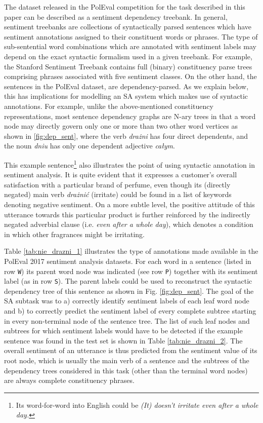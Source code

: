 \documentclass[10pt, a4paper]{article}
\begin{document}
The dataset released in the PolEval competition for the task described in this paper can be described as a sentiment dependency treebank. In general, sentiment treebanks are collections of syntactically parsed sentences which have sentiment annotations assigned to their constituent words or phrases. The type of sub-sentential word combinations which are annotated with  sentiment labels may depend on the exact syntactic formalism used in a given treebank. For example, the Stanford Sentiment Treebank \cite{socher2013recursive} contains full (binary) constituency parse trees comprising phrases associated with five sentiment classes. On the other hand, the sentences in the PolEval dataset, are dependency-parsed. As we explain below, this has implications for modelling an SA system which makes use of syntactic annotations. For example, unlike the above-mentioned constituency representations, most sentence dependency graphs are N-ary trees in that a word node may directly govern only one or more than two other word vertices as shown in \ref{fig:dep_sent}, where the verb \textit{drażni} has four direct dependents, and the noun \textit{dniu} has only one dependent adjective \textit{całym}. 
\par This example sentence\footnote{Its word-for-word into English could be \textit{(It) doesn't irritate even after a whole day.}} also illustrates the point of using syntactic annotation in sentiment analysis. It is quite evident that it expresses a customer's overall satisfaction with a particular brand of perfume, even though its (directly negated) main verb \textit{drażnić} (irritate) could be found in a list of keywords denoting negative sentiment. On a more subtle level, the positive attitude of this utterance towards this particular product is further reinforced by the indirectly negated adverbial clause (i.e. \textit{even after a whole day}), which denotes a condition in which other fragrances might be irritating.
\par Table \ref{tab:nie_drazni_1} illustrates the type of annotations made available in the PolEval 2017 sentiment analysis datasets. For each word in a sentence (listed in row \texttt{W}) its parent word node was indicated (see row \texttt{P}) together with its sentiment label (as in row \texttt{S}). The parent labels could be used to reconstruct the syntactic dependency tree of this sentence as shown in Fig. \ref{fig:dep_sent}. The goal of the SA subtask was to  a) correctly identify sentiment labels of each leaf word node and b) to correctly predict the sentiment label of every complete subtree starting in every non-terminal node of the sentence tree. The list of such leaf nodes and subtrees for which sentiment labels would have to be detected if the example sentence was found in the test set is shown in Table \ref{tab:nie_drazni_2}. The overall sentiment of an utterance is thus predicted from the sentiment value of its root node, which is usually the main verb of a sentence and the subtrees of the dependency trees considered in this task (other than the terminal word nodes) are always complete constituency phrases. 
\end{document}
